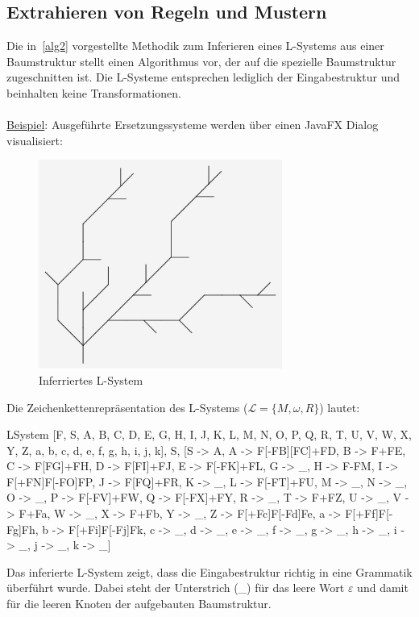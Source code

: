 \subsection*{Extrahieren von Regeln und Mustern}
Die in~\ref{alg2} vorgestellte Methodik zum Inferieren eines L-Systems aus einer Baumstruktur
stellt einen Algorithmus vor, der auf die spezielle Baumstruktur zugeschnitten ist.
Die L-Systeme entsprechen lediglich der Eingabestruktur und beinhalten keine Transformationen.\\~\\
\underline{Beispiel}: Ausgeführte Ersetzungssysteme werden über einen JavaFX Dialog visualisiert:
\begin{figure}[H]
    \centering
    \includegraphics[width=8cm]{../images/evaluierung_inferrieren_lsystem.png}
    \caption{Inferriertes L-System}
\end{figure}
Die Zeichenkettenrepräsentation des L-Systems ($\mathcal{L}=\{M,\omega,R\}$) lautet:
\begin{csource}
LSystem{
    [F, S, A, B, C, D, E, G, H, I, J, K, L, M, N, O, P, Q, R, T, U, V, W, X, Y, Z, a, b, c, d, e, f, g, h, i, j, k],
    S,
    [S -> A, A -> F[-FB][FC]+FD, B -> F+FE, C -> F[FG]+FH, D -> F[FI]+FJ, E -> F[-FK]+FL, G -> _, H -> F-FM, I -> F[+FN]F[-FO]FP, J -> F[FQ]+FR, K -> _, L -> F[-FT]+FU, M -> _, N -> _, O -> _, P -> F[-FV]+FW, Q -> F[-FX]+FY, R -> _, T -> F+FZ, U -> _, V -> F+Fa, W -> _, X -> F+Fb, Y -> _, Z -> F[+Fc]F[-Fd]Fe, a -> F[+Ff]F[-Fg]Fh, b -> F[+Fi]F[-Fj]Fk, c -> _, d -> _, e -> _, f -> _, g -> _, h -> _, i -> _, j -> _, k -> _]
}
\end{csource}

Das inferierte L-System zeigt, dass die Eingabestruktur richtig in eine Grammatik überführt wurde.
Dabei steht der Unterstrich (\_) für das leere Wort $\varepsilon$ und damit für die leeren Knoten
der aufgebauten Baumstruktur.

